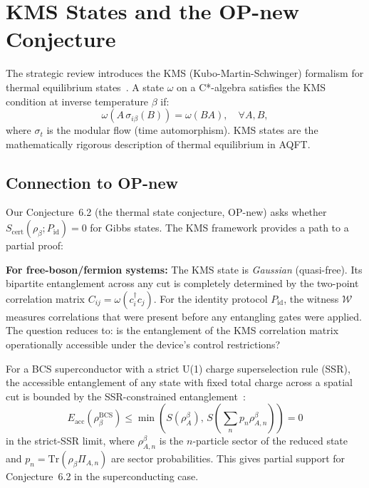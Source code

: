 \documentclass[11pt,letterpaper]{article}
\newcommand{\Scert}{S_{\mathrm{cert}}}
\begin{document}
\section{KMS States and the OP-new Conjecture}

The strategic review introduces the KMS (Kubo-Martin-Schwinger) formalism for
thermal equilibrium states~\cite{Haag1967}.  A state $\omega$ on a C*-algebra
satisfies the KMS condition at inverse temperature $\beta$ if:
\begin{equation}
  \omega(A\,\sigma_{i\beta}(B)) = \omega(BA), \quad \forall A, B,
\end{equation}
where $\sigma_t$ is the modular flow (time automorphism).  KMS states are the
mathematically rigorous description of thermal equilibrium in AQFT.

\subsection{Connection to OP-new}

Our Conjecture~6.2 (the thermal state conjecture, OP-new) asks whether
$\Scert(\rho_\beta; P_{\mathrm{id}}) = 0$ for Gibbs states.  The KMS framework
provides a path to a partial proof:

\textbf{For free-boson/fermion systems:} The KMS state is \emph{Gaussian} (quasi-free).
Its bipartite entanglement across any cut is completely determined by the two-point
correlation matrix $C_{ij} = \omega(c^\dagger_i c_j)$.  For the identity protocol
$P_{\mathrm{id}}$, the witness $\mathcal{W}$ measures correlations that were present
before any entangling gates were applied.  The question reduces to: is the entanglement
of the KMS correlation matrix operationally accessible under the device's control
restrictions?

For a BCS superconductor with a strict U(1) charge superselection rule (SSR), the
accessible entanglement of any state with fixed total charge across a spatial cut is
bounded by the SSR-constrained entanglement~\cite{Wiseman2003}:
\begin{equation}
  E_{\mathrm{acc}}(\rho_\beta^{\mathrm{BCS}})
  \leq \min\!\left(S(\rho_A^\beta),\, S\!\left(\sum_n p_n \rho_{A,n}^\beta\right)\right) = 0
\end{equation}
in the strict-SSR limit, where $\rho_{A,n}^\beta$ is the $n$-particle sector of the
reduced state and $p_n = \mathrm{Tr}(\rho_\beta \Pi_{A,n})$ are sector probabilities.
This gives partial support for Conjecture~6.2 in the superconducting case.
\end{document}

